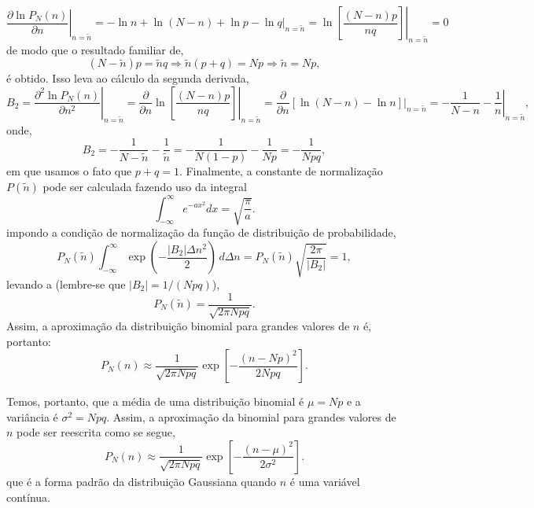 \begin{equation*}
\left. \dfrac{\partial \ln P_N(n)}{\partial n} \right|_{n=\tilde{n}} = -\ln n + \ln (N - n) + \ln p - \ln q \bigg|_{n=\tilde{n}} = \left. \ln\left[\dfrac{(N - n)p}{nq}\right] \right|_{n=\tilde{n}} = 0
\end{equation*}
de modo que o resultado familiar de,
\begin{equation*}
(N - \tilde{n})p = \tilde{n} q \Rightarrow \tilde{n} (p + q) = Np \Rightarrow  \tilde{n} = Np,
\end{equation*}
é obtido. Isso leva ao cálculo da segunda derivada,
\begin{equation*}
B_2 = \left. \frac{\partial^2 \ln P_N(n)}{\partial n^2} \right|_{n=\tilde{n}} = \dfrac{\partial}{\partial n} \left.\ln\left[\dfrac{(N - n)p}{nq}\right] \right|_{n=\tilde{n}} = \dfrac{\partial}{\partial n} \left[\ln(N - n) - \ln n\right]\bigg|_{n=\tilde{n}} = \left. -\dfrac{1}{N - n} - \dfrac{1}{n} \right|_{n=\tilde{n}},
\end{equation*}
onde,
\begin{equation*}
B_2 = -\dfrac{1}{N - \tilde{n}} - \dfrac{1}{\tilde{n}} = -\dfrac{1}{N(1 - p)} - \dfrac{1}{Np} = -\dfrac{1}{Npq},
\end{equation*}
em que usamos o fato que $p + q = 1$. Finalmente, a constante de normalização $P(\tilde{n})$ pode ser calculada fazendo uso da integral
\begin{equation}\label{3.10}
\int_{-\infty}^{\infty} e^{-ax^2} dx = \sqrt{\dfrac{\pi}{a}}.
\end{equation}
impondo a condição de normalização da função de distribuição de probabilidade,
\begin{equation*}
P_N(\tilde{n}) \int_{-\infty}^{\infty} \exp{\left(-\dfrac{|B_2| \Delta n^2}{2}\right)}\,d\Delta n = P_N(\tilde{n}) \sqrt{\dfrac{2\pi}{|B_2|}} = 1, 
\end{equation*}
levando a (lembre-se que $|B_2| = 1/(Npq)$),
\begin{equation*}
P_N(\tilde{n}) = \dfrac{1}{\sqrt{2\pi Npq}}.
\end{equation*}
Assim, a aproximação da distribuição binomial para grandes valores de $n$ é, portanto:
\begin{equation*}
P_N(n) \approx \dfrac{1}{\sqrt{2\pi Npq}}\exp\left[-\dfrac{(n - Np)^2}{2Npq}\right].
\end{equation*}

Temos, portanto, que a média de uma distribuição binomial é $\mu = Np$ e a variância é $\sigma^2 = Npq$. Assim, a aproximação da binomial para grandes valores de $n$ pode ser reescrita como se segue,
\begin{equation}
P_N(n) \approx \dfrac{1}{\sqrt{2\pi Npq}}\exp\left[-\dfrac{(n - \mu)^2}{2\sigma^2}\right].
\end{equation}
que é a forma padrão da distribuição Gaussiana quando $n$ é uma variável contínua.

